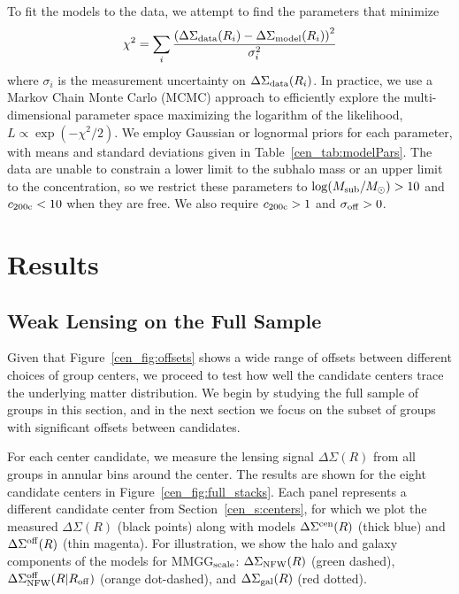 To fit the models to the data, we attempt to find the
  parameters that minimize
\begin{equation}
\chi^2=\sum_i \frac{\left(\Delta\Sigma_{\rm data}(R_i)-\Delta\Sigma_{\rm model}(R_i)\right)^2}{\sigma_i^2}
\end{equation}
where $\sigma_i$ is the measurement uncertainty on
  $\Delta\Sigma_{\rm data}(R_i)$. In practice, we use a Markov Chain
  Monte Carlo (MCMC) approach to efficiently explore the multi-dimensional
  parameter space maximizing the logarithm of the likelihood,
  $L\propto\exp(-\chi^2/2)$. We employ Gaussian or lognormal priors for each
  parameter, with means and standard deviations given in
  Table~\ref{cen_tab:modelPars}. The data are unable to constrain a lower
  limit to the subhalo mass or an upper limit to the concentration, so we restrict these
parameters to $\log(M_{\rm sub}/M_{\odot})>10$ and $c_{\rm
  200c}<10$ when they are free. We also require $c_{\rm 200c}>1$ and $\sigma_{\rm
  off}>0$.



\section{Results}
\label{cen_s:results}

\subsection{Weak Lensing on the Full Sample}
\label{cen_s:comparing_cen}

Given that Figure~\ref{cen_fig:offsets} shows a wide range of
offsets between different choices of group centers, we proceed
to test how well the candidate centers trace the underlying matter
distribution. We begin by studying the full sample of groups in this
section, and in the next section we focus on the subset of groups with significant
offsets between candidates. 

For each center candidate, we measure the lensing signal
$\Delta\Sigma(R)$ from all groups in annular bins around the center.
The results are shown for the eight candidate centers in
Figure~\ref{cen_fig:full_stacks}. Each panel represents a different
candidate center from Section~\ref{cen_s:centers}, for which we plot the
measured $\Delta\Sigma(R)$ (black points) along with models
$\Delta\Sigma^{\rm cen}(R)$ (thick blue) and $\Delta\Sigma^{\rm
  off}(R)$ (thin magenta). For illustration, we show the halo and
galaxy components of the models for MMGG$_{\rm scale}$:
$\Delta\Sigma_{\rm NFW}(R)$ (green dashed), $\Delta\Sigma_{\rm
  NFW}^{\rm off}(R|R_{\rm off})$ (orange dot-dashed), and
$\Delta\Sigma_{\rm gal}(R)$ (red dotted). 

